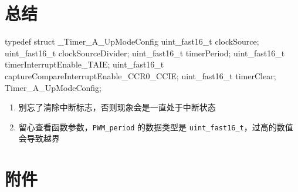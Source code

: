 \documentclass[a4paper,10pt,UTF8]{paper}
\numberwithin{equation}{section}
\numberwithin{figure}{section}
\begin{document}
\section{总结}

\begin{ccode}
  typedef struct _Timer_A_UpModeConfig
  {
    uint_fast16_t clockSource;
    uint_fast16_t clockSourceDivider;
    uint_fast16_t timerPeriod;
    uint_fast16_t timerInterruptEnable_TAIE;
    uint_fast16_t captureCompareInterruptEnable_CCR0_CCIE;
    uint_fast16_t timerClear;
  } Timer_A_UpModeConfig;
\end{ccode}

\begin{enumerate}
  \item 别忘了清除中断标志，否则现象会是一直处于中断状态
  \item 留心查看函数参数，\texttt{PWM\_period} 的数据类型是 \texttt{uint\_fast16\_t}，过高的数值会导致越界
\end{enumerate}

\section{附件}
\end{document}
